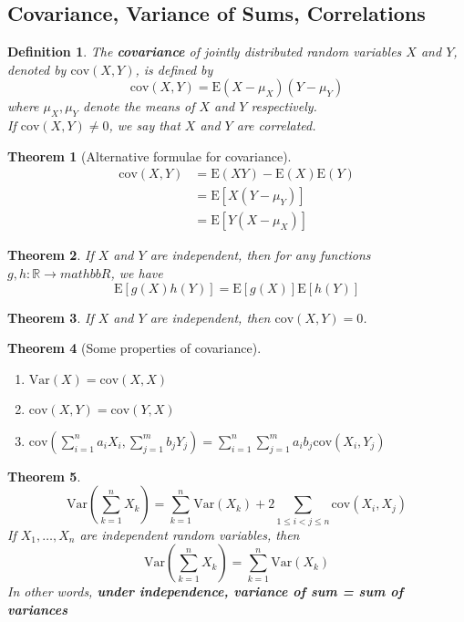 \documentclass[12pt]{article}
\newcommand{\var}{\mathrm{Var}}
\newcommand{\expec}{\mathrm{E}}
\newcommand{\cov}{\mathrm{cov}}
\newtheorem{definition}{Definition}[section]
\newtheorem{theorem}{Theorem}[section]
\theoremstyle{definition}
\begin{document}
\subsection{Covariance, Variance of Sums, Correlations}
\begin{definition}\normalfont The \textbf{covariance} of jointly distributed random variables $X$ and $Y$, denoted by $\cov(X,Y)$, is defined by
\[
\cov(X,Y) = \expec(X-\mu_X)(Y-\mu_Y)
\]
where $\mu_X, \mu_Y$ denote the means of $X$ and $Y$ respectively.\\
If $\cov(X,Y)\neq 0$, we say that $X$ and $Y$ are correlated.
\end{definition}
\begin{theorem}[Alternative formulae for covariance]
\hfill\\\normalfont 
\[
\begin{aligned}
\cov(X,Y)&=\expec(XY)-\expec(X)\expec(Y)\\
&=\expec[X(Y-\mu_Y)]\\
&=\expec[Y(X-\mu_X)]
\end{aligned}
\]
\end{theorem}
\begin{theorem}\normalfont If $X$ and $Y$ are independent, then for any functions $g,h:\mathbb{R}\to mathbb{R}$, we have
\[
\expec[g(X)h(Y)]=\expec[g(X)]\expec[h(Y)]
\]
\end{theorem}
\begin{theorem}\normalfont If $X$ and $Y$ are independent, then $\cov(X,Y)=0$.
\end{theorem}
\begin{theorem}[Some properties of covariance]
\hfill\\\normalfont
\begin{enumerate}
\item $\var(X) = \cov(X,X)$
\item $\cov(X,Y)=\cov(Y,X)$
\item $\cov\left(\sum_{i=1}^na_iX_i,\sum_{j=1}^mb_jY_j\right)=\sum_{i=1}^n\sum_{j=1}^m a_ib_j\cov(X_i,Y_j)$
\end{enumerate}
\end{theorem}
\begin{theorem}
\[
\var\left(\sum_{k=1}^n X_k\right)=\sum_{k=1}^n\var(X_k)+2\sum_{1\leq i<j\leq n}\cov(X_i, X_j)
\]
If $X_1,\ldots, X_n$ are independent random variables, then
\[
\var\left(\sum_{k=1}^n X_k\right)=\sum_{k=1}^n\var(X_k)
\]
In other words, \textbf{under independence, variance of sum = sum of variances}
\end{theorem}
\end{document}
